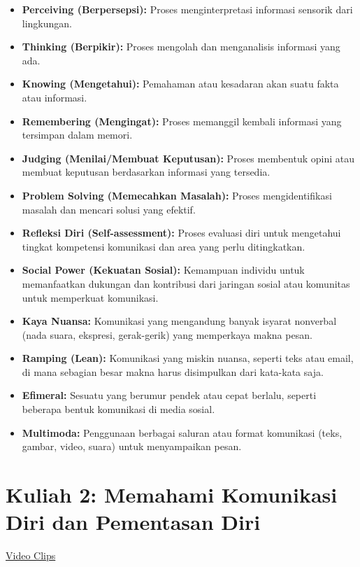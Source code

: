 \documentclass[
  letterpaper,
  DIV=11,
  numbers=noendperiod]{scrreprt}
\begin{document}
\begin{itemize}
\item
  \textbf{Perceiving (Berpersepsi):} Proses menginterpretasi informasi
  sensorik dari lingkungan.
\item
  \textbf{Thinking (Berpikir):} Proses mengolah dan menganalisis
  informasi yang ada.
\item
  \textbf{Knowing (Mengetahui):} Pemahaman atau kesadaran akan suatu
  fakta atau informasi.
\item
  \textbf{Remembering (Mengingat):} Proses memanggil kembali informasi
  yang tersimpan dalam memori.
\item
  \textbf{Judging (Menilai/Membuat Keputusan):} Proses membentuk opini
  atau membuat keputusan berdasarkan informasi yang tersedia.
\item
  \textbf{Problem Solving (Memecahkan Masalah):} Proses mengidentifikasi
  masalah dan mencari solusi yang efektif.
\item
  \textbf{Refleksi Diri (Self-assessment):} Proses evaluasi diri untuk
  mengetahui tingkat kompetensi komunikasi dan area yang perlu
  ditingkatkan.
\item
  \textbf{Social Power (Kekuatan Sosial):} Kemampuan individu untuk
  memanfaatkan dukungan dan kontribusi dari jaringan sosial atau
  komunitas untuk memperkuat komunikasi.
\item
  \textbf{Kaya Nuansa:} Komunikasi yang mengandung banyak isyarat
  nonverbal (nada suara, ekspresi, gerak-gerik) yang memperkaya makna
  pesan.
\item
  \textbf{Ramping (Lean):} Komunikasi yang miskin nuansa, seperti teks
  atau email, di mana sebagian besar makna harus disimpulkan dari
  kata-kata saja.
\item
  \textbf{Efimeral:} Sesuatu yang berumur pendek atau cepat berlalu,
  seperti beberapa bentuk komunikasi di media sosial.
\item
  \textbf{Multimoda:} Penggunaan berbagai saluran atau format komunikasi
  (teks, gambar, video, suara) untuk menyampaikan pesan.
\end{itemize}


\chapter{Kuliah 2: Memahami Komunikasi Diri dan Pementasan
Diri}\label{kuliah-2-memahami-komunikasi-diri-dan-pementasan-diri}

\href{https://youtube.com/playlist?list=PL_m-BplfO92GU2Qz6-_CtBAJEQ1Cv3wKr&si=sgbfefy8EFwEb2A8}{Video
Clips}
\end{document}
